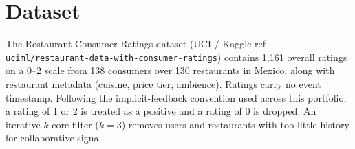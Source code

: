 \section{Dataset}
The Restaurant Consumer Ratings dataset (UCI / Kaggle ref
\texttt{uciml/restaurant-data-with-consumer-ratings}) contains 1{,}161
overall ratings on a 0--2 scale from 138 consumers over 130 restaurants in
Mexico, along with restaurant metadata (cuisine, price tier, ambience).
Ratings carry no event timestamp. Following the implicit-feedback
convention used across this portfolio, a rating of 1 or 2 is treated as a
positive and a rating of 0 is dropped. An iterative $k$-core filter
($k=3$) removes users and restaurants with too little history for
collaborative signal.
